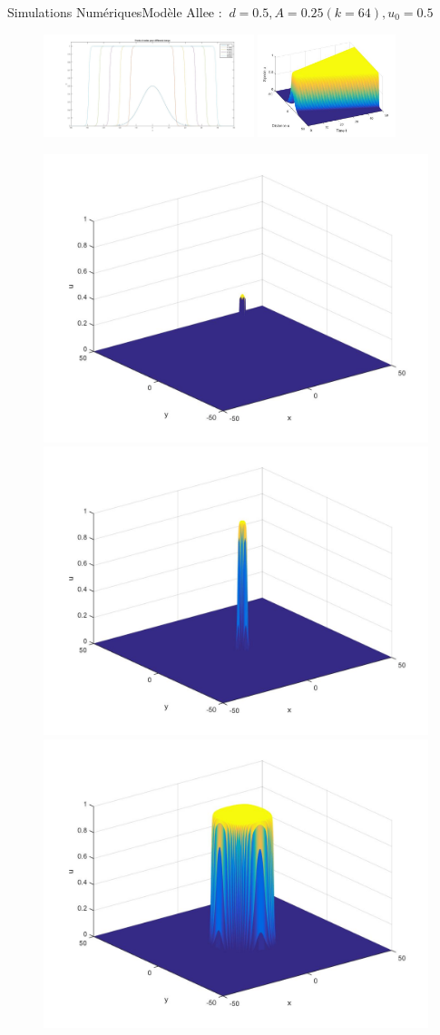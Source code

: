 \documentclass[10pt]{beamer}
\begin{document}
\begin{frame}{Simulations Numériques}{Modèle Allee : $\ d=0.5, A=0.25 (k=64), u_0=0.5$}
\begin{figure}[H]
	\centering
	\includegraphics[width=0.40\linewidth, height=3cm]{Allee/F2312}\hfill
	\includegraphics[width=0.55\linewidth, height=3cm]{Allee/F4312}
\end{figure}
\begin{figure}[H]
	\centering
	\includegraphics[width=0.3\linewidth]{Allee/312__1_}\hfill
    \includegraphics[width=0.3\linewidth]{Allee/312__2_}\hfill
	\includegraphics[width=0.3\linewidth]{Allee/312__3_}
\end{figure}
\end{frame}
\end{document}
